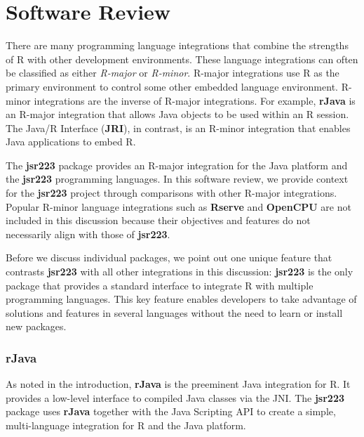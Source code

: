 \chapter{Software Review}

There are many programming language integrations that combine the strengths of R with other development environments. These language integrations can often be classified as either \textit{R-major} or \textit{R-minor}. R-major integrations use R as the primary environment to control some other embedded language environment. R-minor integrations are the inverse of R-major integrations. For example, \textbf{rJava} is an R-major integration that allows Java objects to be used within an R session. The Java/R Interface (\textbf{JRI}), in contrast, is an R-minor integration that enables Java applications to embed R.

The \textbf{jsr223} package provides an R-major integration for the Java platform and the \textbf{jsr223} programming languages. In this software review, we provide context for the \textbf{jsr223} project through comparisons with other R-major integrations. Popular R-minor language integrations such as \textbf{Rserve} \citep{rserve} and \textbf{OpenCPU} \citep{opencpu} are not included in this discussion because their objectives and features do not necessarily align with those of \textbf{jsr223}.

Before we discuss individual packages, we point out one unique feature that contrasts \textbf{jsr223} with all other integrations in this discussion: \textbf{jsr223} is the only package that provides a standard interface to integrate R with multiple programming languages. This key feature enables developers to take advantage of solutions and features in several languages without the need to learn or install new packages.

\subsection{\textbf{rJava}}

As noted in the introduction, \textbf{rJava} is the preeminent Java integration for R. It provides a low-level interface to compiled Java classes via the JNI. The \textbf{jsr223} package uses \textbf{rJava} together with the Java Scripting API to create a simple, multi-language integration for R and the Java platform.

